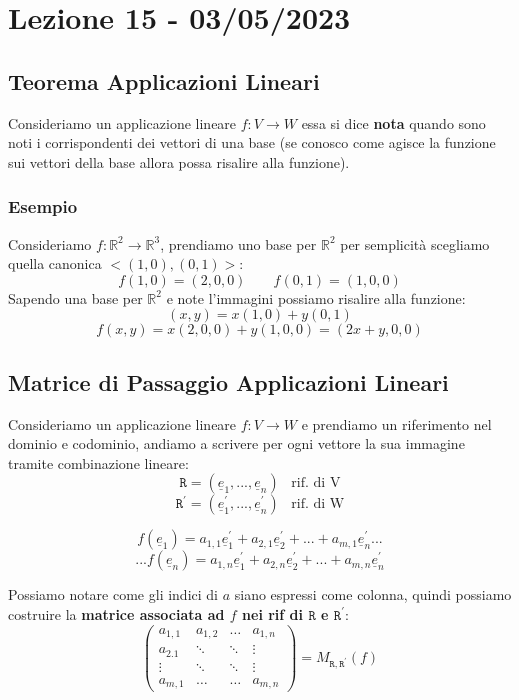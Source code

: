 \section{Lezione 15 - 03/05/2023}

\subsection{Teorema Applicazioni Lineari}
Consideriamo un applicazione lineare $f: V \rightarrow W$ essa si dice \textbf{nota} quando sono noti i corrispondenti dei vettori di una base (se conosco come agisce la funzione sui vettori della base allora possa risalire alla funzione).

\subsubsection{Esempio}
Consideriamo $f: \mathbb{R}^2 \rightarrow \mathbb{R}^3$, prendiamo uno base per $\mathbb{R}^2$ per semplicità scegliamo quella canonica $<(1,0),(0,1)>$:
$$ f(1,0) = (2,0,0) \;\;\;\;\;\;\; f(0,1) = (1,0,0) $$
Sapendo una base per $\mathbb{R}^2$ e note l'immagini possiamo risalire alla funzione:
$$ (x,y)=x(1,0)+y(0,1) $$
$$ f(x,y)=x(2,0,0)+y(1,0,0) = (2x+y,0,0)$$

\subsection{Matrice di Passaggio Applicazioni Lineari}
Consideriamo un applicazione lineare $f: V \rightarrow W$ e prendiamo un riferimento nel dominio e codominio, andiamo a scrivere per ogni vettore la sua immagine tramite combinazione lineare:
$$ \mathtt{R}=(\underline{e}_1,...,\underline{e}_n) \;\;\; \text{rif. di V} $$
$$ \mathtt{R}^{\prime}=(\underline{e}_1^{\prime},...,\underline{e}_n^{\prime}) \;\;\; \text{rif. di W} $$

$$ f(\underline{e}_1) = a_{1,1}\underline{e}^{\prime}_1+a_{2,1}\underline{e}^{\prime}_2+...+a_{m,1}\underline{e}^{\prime}_n... $$
$$ ... f(\underline{e}_n) = a_{1,n}\underline{e}^{\prime}_1+a_{2,n}\underline{e}^{\prime}_2+...+a_{m,n}\underline{e}^{\prime}_n $$

Possiamo notare come gli indici di $a$ siano espressi come colonna, quindi possiamo costruire la \textbf{matrice associata ad $f$ nei rif di $\mathtt{R}$ e $\mathtt{R}^{\prime}$}:
$$
\begin{pmatrix}
a_{1,1} & a_{1,2} & \dots & a_{1,n} \\
a_{2.1} & \ddots & \ddots & \vdots \\
\vdots & \ddots & \ddots & \vdots \\
a_{m,1} & \dots & \dots & a_{m,n}
\end{pmatrix}
= M_{\mathtt{R},\mathtt{R}^{\prime}}(f)
$$

